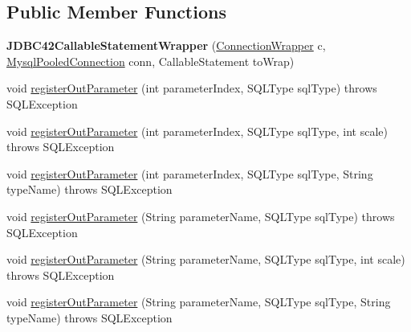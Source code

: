 \subsection*{Public Member Functions}
\begin{DoxyCompactItemize}
\item 
\mbox{\label{classcom_1_1mysql_1_1jdbc_1_1jdbc2_1_1optional_1_1_j_d_b_c42_callable_statement_wrapper_a18607f568da131fa4352824ead0b9ac5}} 
{\bfseries J\+D\+B\+C42\+Callable\+Statement\+Wrapper} (\mbox{\hyperlink{classcom_1_1mysql_1_1jdbc_1_1jdbc2_1_1optional_1_1_connection_wrapper}{Connection\+Wrapper}} c, \mbox{\hyperlink{classcom_1_1mysql_1_1jdbc_1_1jdbc2_1_1optional_1_1_mysql_pooled_connection}{Mysql\+Pooled\+Connection}} conn, Callable\+Statement to\+Wrap)
\item 
void \mbox{\hyperlink{classcom_1_1mysql_1_1jdbc_1_1jdbc2_1_1optional_1_1_j_d_b_c42_callable_statement_wrapper_ad3f62b1f3c34747abd90a3699a898125}{register\+Out\+Parameter}} (int parameter\+Index, S\+Q\+L\+Type sql\+Type)  throws S\+Q\+L\+Exception 
\item 
void \mbox{\hyperlink{classcom_1_1mysql_1_1jdbc_1_1jdbc2_1_1optional_1_1_j_d_b_c42_callable_statement_wrapper_a2b8c35a61f0f8fb09126b606d410489b}{register\+Out\+Parameter}} (int parameter\+Index, S\+Q\+L\+Type sql\+Type, int scale)  throws S\+Q\+L\+Exception 
\item 
void \mbox{\hyperlink{classcom_1_1mysql_1_1jdbc_1_1jdbc2_1_1optional_1_1_j_d_b_c42_callable_statement_wrapper_a7bc579bb5c2511283b1f82e05b92ceac}{register\+Out\+Parameter}} (int parameter\+Index, S\+Q\+L\+Type sql\+Type, String type\+Name)  throws S\+Q\+L\+Exception 
\item 
void \mbox{\hyperlink{classcom_1_1mysql_1_1jdbc_1_1jdbc2_1_1optional_1_1_j_d_b_c42_callable_statement_wrapper_a019b068f8f484eed753e5edca086fb96}{register\+Out\+Parameter}} (String parameter\+Name, S\+Q\+L\+Type sql\+Type)  throws S\+Q\+L\+Exception 
\item 
void \mbox{\hyperlink{classcom_1_1mysql_1_1jdbc_1_1jdbc2_1_1optional_1_1_j_d_b_c42_callable_statement_wrapper_a477132d86c0829be4ba36d219efaf5ff}{register\+Out\+Parameter}} (String parameter\+Name, S\+Q\+L\+Type sql\+Type, int scale)  throws S\+Q\+L\+Exception 
\item 
void \mbox{\hyperlink{classcom_1_1mysql_1_1jdbc_1_1jdbc2_1_1optional_1_1_j_d_b_c42_callable_statement_wrapper_aa91a13459eebf68883165b913cab2ad8}{register\+Out\+Parameter}} (String parameter\+Name, S\+Q\+L\+Type sql\+Type, String type\+Name)  throws S\+Q\+L\+Exception 

\end{DoxyCompactItemize}
